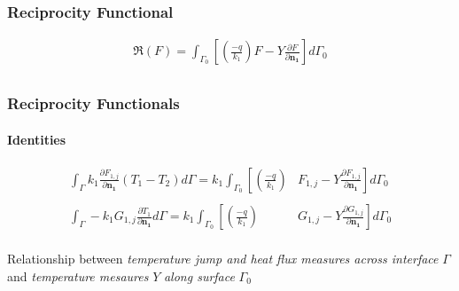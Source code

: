 \documentclass[aspectratio=169]{beamer}
\begin{document}
%
\begin{frame}
	\frametitle{Reciprocity Functional}
	\begin{definition}{}
		\begin{align*}
		\Re(F) = \int_{\Gamma_0}\left[\left(\frac{-q}{k_1}\right)F - Y\frac{\partial F}{\partial\mathbf{n_1}}\right]d\Gamma_0 \\
		\end{align*}
	\end{definition}
	
	\begin{center}
	\end{center}
	
	\begin{center}
	\end{center}	
\end{frame}
%
\begin{frame}
	\label{slide_fr}
	\frametitle{Reciprocity Functionals}
	\framesubtitle{Identities}
	
	\begin{alertblock}{}
		\begin{align*}
		\int_\Gamma k_1 \frac{\partial F_{1,j}}{\partial\mathbf{n_1}}\left(T_1 - T_2\right)d\Gamma
		=
		k_1\int_{\Gamma_0}\left[\left(\frac{-q}{k_1}\right)\right. & \left.F_{1,j} - Y\frac{\partial F_{1,j}}{\partial\mathbf{n_1}}\right]d\Gamma_0
		\label{identidade_T} \\ \nonumber \\
		\int_\Gamma -k_1 G_{1,j} \frac{\partial T_1}{\partial\mathbf{n_1}}d\Gamma
		=
		k_1\int_{\Gamma_0}\left[\left(\frac{-q}{k_1}\right)\right. & \left.G_{1,j} -  Y\frac{\partial G_{1,j}}{\partial\mathbf{n_1}}\right]d\Gamma_0 \\
		\end{align*}
	\end{alertblock}
	
	\begin{center}
	\end{center}
	
	\begin{alertblock}{}
		Relationship between \textit{temperature jump and heat flux measures across interface} $\Gamma$
		and \textit{temperature mesaures} $Y$ \textit{along surface} $\Gamma_0$
	\end{alertblock}
	\hyperlink{slide_produto_interno}{\beamergotobutton{}}
\end{frame}
\end{document}
